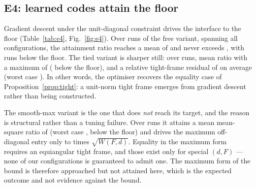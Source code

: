 \documentclass[preprint,12pt]{elsarticle}
\theoremstyle{definition}
\begin{document}
\begin{table}[t]
\centering
\caption{E1: attainment ratio $\widehat W/W(F,d)$ of the calibrated tied readout for random
unit-norm codes, averaged over \EoneTrials{} trials. Values above one are required by
Theorem~\ref{thm:floor}; the approach to one with growing feature load is the content of the
measurement.}
\label{tab:e1}
\small

\end{table}

\subsection{E4: learned codes attain the floor}
\label{sec:res-e4}

Gradient descent under the unit-diagonal constraint drives the interface to the floor
(Table~\ref{tab:e4}, Fig.~\ref{fig:e4}). Over
\EfourFreeRuns{} runs of the free variant, spanning all \EfourConfigs{} configurations, the
attainment ratio reaches a mean of \EfourFreeRatioMean{} and never exceeds
\EfourFreeRatioMax, with \EfourFreeBelowFloor{} runs below the floor. The tied variant is
sharper still: over \EfourTiedRuns{} runs, mean ratio \EfourTiedRatioMean{} with a maximum of
\EfourTiedRatioMax{} (\EfourTiedBelowFloor{} below the floor), and a relative tight-frame
residual of \EfourTiedFrameResidualMean{} on average (worst case
\EfourTiedFrameResidualMax). In other words, the optimiser recovers the equality case of
Proposition~\ref{prop:tight}: a unit-norm tight frame emerges from gradient descent rather than
being constructed.

The smooth-max variant is the one that does \emph{not} reach its target, and the reason is
structural rather than a tuning failure. Over \EfourSoftmaxRuns{} runs it attains a mean
mean-square ratio of \EfourSoftmaxRatioMean{} (worst case \EfourSoftmaxRatioMax,
\EfourSoftmaxBelowFloor{} below the floor) and drives the maximum off-diagonal entry only to
\EfourSoftmaxRatioMaxMean{} times $\sqrt{W(F,d)}$. Equality in the maximum form requires an
equiangular tight frame, and those exist only for special $(d,F)$ --- none of our
\EfourConfigs{} configurations is guaranteed to admit one. The maximum form of the bound is
therefore approached but not attained here, which is the expected outcome and not evidence
against the bound.
\end{document}
